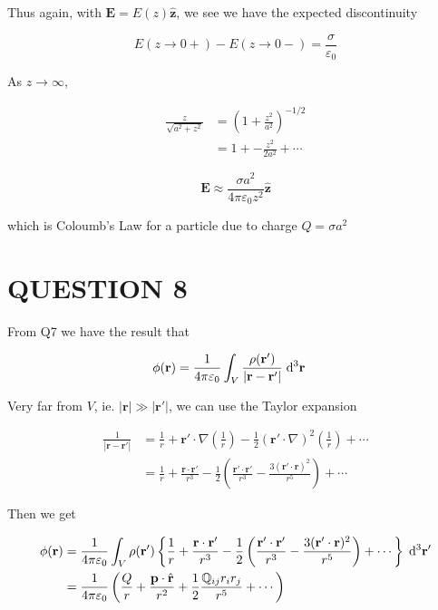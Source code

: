 \documentclass[a4paper]{article}
\begin{document}
Thus again, with $ \mathbf{E} = E(z) \hat{\mathbf{z}} $, we see we have the expected discontinuity

\[ E (z \to 0+) - E(z \to 0-) = \frac{\sigma}{\varepsilon_{0}} \]

As $ z \to \infty $, 

\begin{align*}
\frac{z}{\sqrt{a^{2} + z^{2}}} &  =  \left(  1 + \frac{z^{2}}{a^{2}} \right)^{-1/2}  \\
& = 1 + - \frac{z^{2}}{2a^{2}} + \cdots
\end{align*}

\[ \mathbf{E} \approx \frac{\sigma a^{2}}{4 \pi \varepsilon_{0} z^{2}} \mathbf{\hat{z}} \]

which is Coloumb's Law for a particle due to charge $ Q = \sigma a^{2} $


\section{QUESTION 8}

From Q7 we have the result that

\begin{align*}
\phi(\mathbf{r}) & = \frac{1}{4 \pi \varepsilon_{0}} \int_{V} \frac{\rho(\mathbf{r}')}{| \mathbf{r} - \mathbf{r}' |} \; \mathrm{d}^{3} \mathbf{r}
\end{align*}

Very far from $ V $, ie. $ | \mathbf{r} | \gg | \mathbf{r}' | $, we can use the Taylor expansion

\begin{align*}
\frac{1}{| \mathbf{r} - \mathbf{r}' |} & =  \frac{1}{r} + \mathbf{r}' \cdot \nabla \left(  \frac{1}{r} \right) - \frac{1}{2} (\mathbf{r}' \cdot \nabla )^{2} \left( \frac{1}{r} \right)  + \cdots  \\
& = \frac{1}{r} + \frac{\mathbf{r} \cdot \mathbf{r}'}{r^{3}} - \frac{1}{2} \left(  \frac{\mathbf{r}' \cdot \mathbf{r}'}{r^{3}} - \frac{3 (\mathbf{r}' \cdot \mathbf{r})^{2} }{r^{5}} \right) + \cdots 
\end{align*}

Then we get 


\begin{align*}
\phi(\mathbf{r}) & = \frac{1}{4 \pi \varepsilon_{0}} \int_{V} \rho(\mathbf{r}')  \left\{  \frac{1}{r} + \frac{\mathbf{r} \cdot \mathbf{r}'}{r^{3}} - \frac{1}{2} \left(  \frac{\mathbf{r}' \cdot \mathbf{r}'}{r^{3}} - \frac{3 (\mathbf{r}' \cdot \mathbf{r})^{2} }{r^{5}} \right) + \cdots  \right\}  \; \mathrm{d}^{3} \mathbf{r}' \\
& = \frac{1}{4 \pi \varepsilon_{0}} \left(  \frac{Q}{r} + \frac{\mathbf{p} \cdot \hat{\mathbf{r}} }{r^{2}} + \frac{1}{2} \frac{\mathbb{Q}_{ij} r_{i}r_{j}}{r^{5}} + \cdots \right) 
\end{align*}
\end{document}
